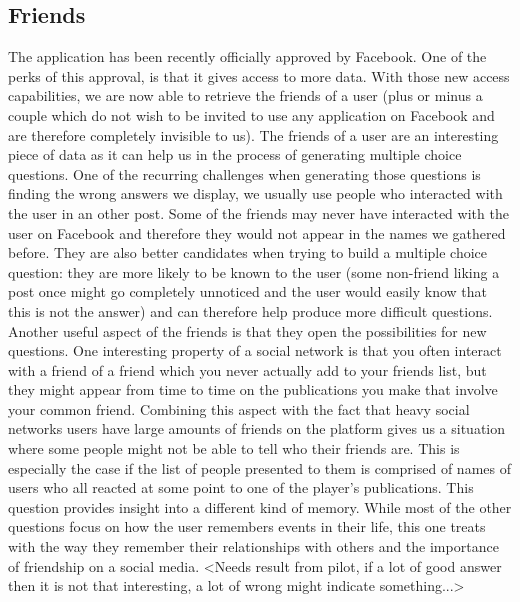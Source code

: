\subsection{Friends}
The application has been recently officially approved by Facebook. One of the perks of this approval, is that it gives access to more data. With those new access capabilities, we are now able to retrieve the friends of a user (plus or minus a couple which do not wish to be invited to use any application on Facebook and are therefore completely invisible to us). The friends of a user are an interesting piece of data as it can help us in the process of generating multiple choice questions. One of the recurring challenges when generating those questions is finding the wrong answers we display, we usually use people who interacted with the user in an other post. Some of the friends may never have interacted with the user on Facebook and therefore they would not appear in the names we gathered before. They are also better candidates when trying to build a multiple choice question: they are more likely to be known to the user (some non-friend liking a post once might go completely unnoticed and the user would easily know that this is not the answer) and can therefore help produce more difficult questions.\\
Another useful aspect of the friends is that they open the possibilities for new questions. One interesting property of a social network is that you often interact with a friend of a friend which you never actually add to your friends list, but they might appear from time to time on the publications you make that involve your common friend. Combining this aspect with the fact that heavy social networks users have large amounts of friends on the platform gives us a situation where some people might not be able to tell who their friends are. This is especially the case if the list of people presented to them is comprised of names of users who all reacted at some point to one of the player's publications. This question provides insight into a different kind of memory. While most of the other questions focus on how the user remembers events in their life, this one treats with the way they remember their relationships with others and the importance of friendship on a social media. <Needs result from pilot, if a lot of good answer then it is not that interesting, a lot of wrong might indicate something...>